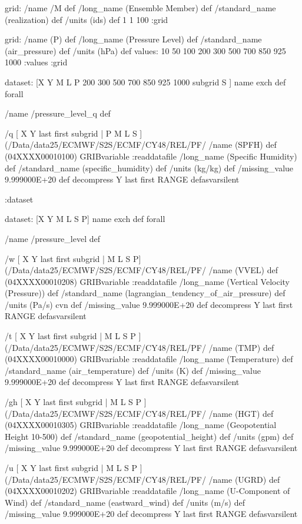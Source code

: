 \begin{ingrid}
{grid:
/name /M def
/long_name (Ensemble Member) def
/standard_name (realization) def
/units (ids) def
1 1 100
:grid

grid:
/name (P) def
/long_name (Pressure Level) def
/standard_name (air_pressure) def
/units (hPa) def
values: 10 50 100 200 300 500 700 850 925 1000 :values
:grid

dataset:
[X Y M L P 200 300 500 700 850 925 1000 subgrid S ] {name exch def } forall

/name /pressure_level_q def

/q { [ X Y last first subgrid | P M L S ] (/Data/data25/ECMWF/S2S/ECMF/CY48/REL/PF/%
/name (SPFH) def
(04XXXX00010100) GRIBvariable
:readdatafile
/long_name (Specific Humidity) def
/standard_name (specific_humidity) def
/units (kg/kg) def
/missing_value 9.999000E+20 def
decompress
Y last first RANGE
} defasvarsilent

:dataset


dataset:
[X Y M L S P] {name exch def } forall

/name /pressure_level def

/w { [ X Y last first subgrid | M L S P] (/Data/data25/ECMWF/S2S/ECMF/CY48/REL/PF/%
/name (VVEL) def
(04XXXX00010208) GRIBvariable
:readdatafile
/long_name (Vertical Velocity (Pressure)) def
/standard_name (lagrangian_tendency_of_air_pressure) def
/units (Pa/s) cvn def
/missing_value 9.999000E+20 def
decompress
Y last first RANGE
} defasvarsilent

/t { [ X Y last first subgrid | M L S P ]  (/Data/data25/ECMWF/S2S/ECMF/CY48/REL/PF/%
/name (TMP) def
(04XXXX00010000) GRIBvariable
:readdatafile
/long_name (Temperature) def
/standard_name (air_temperature) def
/units (K) def
/missing_value 9.999000E+20 def
decompress
Y last first RANGE
} defasvarsilent

/gh { [ X Y last first subgrid | M L S P ]  (/Data/data25/ECMWF/S2S/ECMF/CY48/REL/PF/%
/name (HGT) def
(04XXXX00010305) GRIBvariable
:readdatafile
/long_name (Geopotential Height 10-500) def
/standard_name (geopotential_height) def
/units (gpm) def
/missing_value 9.999000E+20 def
decompress
Y last first RANGE
} defasvarsilent

/u { [ X Y last first subgrid | M L S P ] (/Data/data25/ECMWF/S2S/ECMF/CY48/REL/PF/%
/name (UGRD) def
(04XXXX00010202) GRIBvariable
:readdatafile
/long_name (U-Component of Wind) def
/standard_name (eastward_wind) def
/units (m/s) def
/missing_value 9.999000E+20 def
decompress
Y last first RANGE
} defasvarsilent

}
\end{ingrid}
